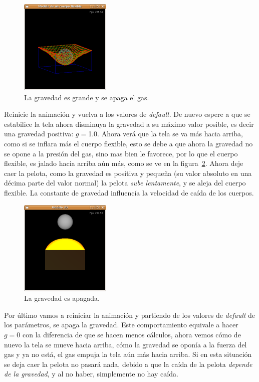\begin{figure}
 \centering
 \includegraphics[]{Img/modGra2}
 \caption[Ejecución con fuerza de gravedad grande y sin presión]{La gravedad es grande y se apaga el gas.}
 \label{grav:test2}
\end{figure}

Reinicie la animación y vuelva a los valores de \emph{\foreignlanguage{english}{default}}. De nuevo espere a que se estabilice la tela ahora disminuya la gravedad a su máximo valor posible, es decir una gravedad positiva: $g=$1.0. Ahora verá que la tela se va más hacia arriba, como si se inflara más el cuerpo flexible, esto se debe a que ahora la gravedad no se opone a la presión del gas, sino mas bien le favorece, por lo que el cuerpo flexible, es jalado hacia arriba aún más, como se ve en la figura~\ref{grav:test3}. Ahora deje caer la pelota, como la gravedad es positiva y pequeña (su valor absoluto en una décima parte del valor normal) la pelota \emph{sube lentamente}, y se aleja del cuerpo flexible. La constante de gravedad influencía la velocidad de caída de los cuerpos.

\begin{figure}
 \centering
 \includegraphics[]{Img/modGra3}
 \caption[Ejecución con la fuerza de gravedad apagada]{La gravedad es apagada.}
 \label{grav:test3}
\end{figure}

Por último vamos a reiniciar la animación y partiendo de los valores de \emph{\foreignlanguage{english}{default}} de los parámetros, se apaga la gravedad. Este comportamiento equivale a hacer $g=0$ con la diferencia de que se hacen menos cálculos, ahora vemos cómo de nuevo la tela se mueve hacia arriba, cómo la gravedad se oponía a la fuerza del gas y ya no está, el gas empuja la tela aún más hacia arriba. Si en esta situación se deja caer la pelota no pasará nada, debido a que la caída de la pelota \emph{depende de la gravedad}, y al no haber, simplemente no hay caída.

